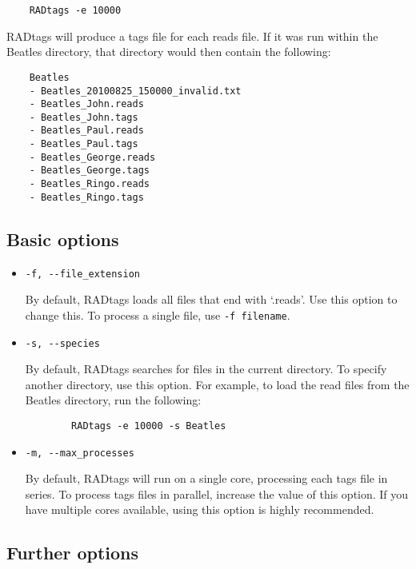 \documentclass[a4paper]{article}
\begin{document}
\begin{verbatim}
    RADtags -e 10000
\end{verbatim}

RADtags will produce a tags file for each reads file. If it was run within the Beatles directory, that directory would then contain the following:

\begin{verbatim}
    Beatles
    - Beatles_20100825_150000_invalid.txt
    - Beatles_John.reads
    - Beatles_John.tags
    - Beatles_Paul.reads
    - Beatles_Paul.tags
    - Beatles_George.reads
    - Beatles_George.tags
    - Beatles_Ringo.reads
    - Beatles_Ringo.tags
\end{verbatim}

\subsection{Basic options}

\begin{itemize}
    \item \verb|-f, --file_extension|
    
    By default, RADtags loads all files that end with `.reads'. Use this option to change this. To process a single file, use \verb|-f filename|.
    
    \item \verb|-s, --species|
    
    By default, RADtags searches for files in the current directory. To specify another directory, use this option. For example, to load the read files from the Beatles directory, run the following:
    
    \begin{verbatim}
        RADtags -e 10000 -s Beatles
    \end{verbatim}
    
    \item \verb|-m, --max_processes|
    
    By default, RADtags will run on a single core, processing each tags file in series. To process tags files in parallel, increase the value of this option. If you have multiple cores available, using this option is highly recommended.

\end{itemize}


\subsection{Further options}
\end{document}

